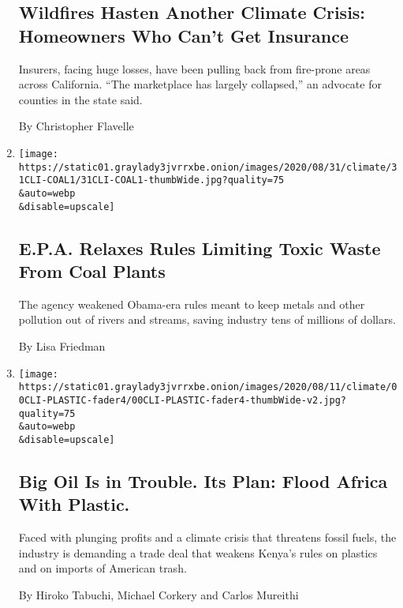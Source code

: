\begin{enumerate}
  \hypertarget{wildfires-hasten-another-climate-crisis-homeowners-who-cant-get-insurance}{%
  \subsection{Wildfires Hasten Another Climate Crisis: Homeowners Who
  Can't Get
  Insurance}\label{wildfires-hasten-another-climate-crisis-homeowners-who-cant-get-insurance}}

  Insurers, facing huge losses, have been pulling back from fire-prone
  areas across California. ``The marketplace has largely collapsed,'' an
  advocate for counties in the state said.

  By Christopher Flavelle
\item
  \href{/2020/08/31/climate/trump-coal-plants.html}{}

  \texttt{[image: https://static01.graylady3jvrrxbe.onion/images/2020/08/31/climate/31CLI-COAL1/31CLI-COAL1-thumbWide.jpg?quality=75\\\&auto=webp\\\&disable=upscale]}

  \hypertarget{epa-relaxes-rules-limiting-toxic-waste-from-coal-plants}{%
  \subsection{E.P.A. Relaxes Rules Limiting Toxic Waste From Coal
  Plants}\label{epa-relaxes-rules-limiting-toxic-waste-from-coal-plants}}

  The agency weakened Obama-era rules meant to keep metals and other
  pollution out of rivers and streams, saving industry tens of millions
  of dollars.

  By Lisa Friedman
\item
  \href{/2020/08/30/climate/oil-kenya-africa-plastics-trade.html}{}

  \texttt{[image: https://static01.graylady3jvrrxbe.onion/images/2020/08/11/climate/00CLI-PLASTIC-fader4/00CLI-PLASTIC-fader4-thumbWide-v2.jpg?quality=75\\\&auto=webp\\\&disable=upscale]}

  \hypertarget{big-oil-is-in-trouble-its-plan-flood-africa-with-plastic}{%
  \subsection{Big Oil Is in Trouble. Its Plan: Flood Africa With
  Plastic.}\label{big-oil-is-in-trouble-its-plan-flood-africa-with-plastic}}

  Faced with plunging profits and a climate crisis that threatens fossil
  fuels, the industry is demanding a trade deal that weakens Kenya's
  rules on plastics and on imports of American trash.

  By Hiroko Tabuchi, Michael Corkery and Carlos Mureithi
\end{enumerate}

